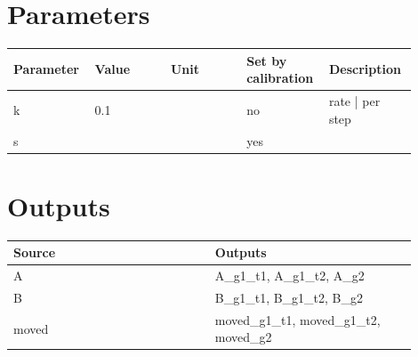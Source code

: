 \documentclass{article}
\begin{document}
\section*{Parameters}
\begin{longtable}{p{0.18\linewidth}p{0.18\linewidth}p{0.18\linewidth}p{0.18\linewidth}p{0.18\linewidth}}
Parameter & Value & Unit & Set by calibration & Description \\
\hline
\endhead
k & 0.1 &  & no & rate | per step \\
s &  &  & yes &  \\
\end{longtable}
\section*{Outputs}
\begin{longtable}{p{0.45\linewidth}p{0.45\linewidth}}
Source & Outputs \\
\hline
\endhead
A & A\_g1\_t1, A\_g1\_t2, A\_g2 \\
B & B\_g1\_t1, B\_g1\_t2, B\_g2 \\
moved & moved\_g1\_t1, moved\_g1\_t2, moved\_g2 \\
\end{longtable}
\end{document}
